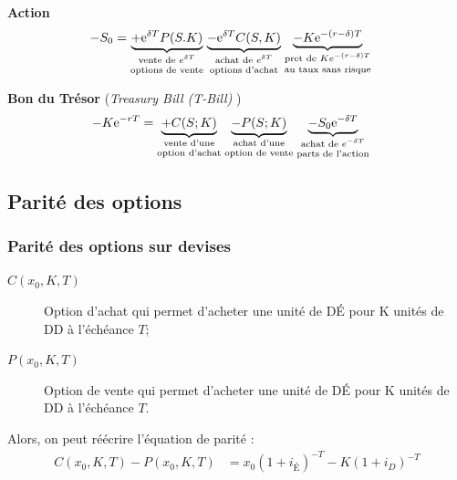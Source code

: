 \documentclass[10pt, french]{article}
\begin{document}
\begin{multicols*}{2}
\textbf{Action}
\begin{align*}
	-S_{0}
	&=	\underset{\text{\shortstack{vente de $e^{\delta T}$\\ options de vente}}}{\underbrace{+\textrm{e}^{\delta T} P(S. K)}} \;
		\underset{\text{\shortstack{achat de $e^{\delta T}$\\ options d'achat}}}{\underbrace{-\textrm{e}^{\delta T} C(S, K)}} \;
		\underset{\text{\shortstack{pret de $Ke^{-(r - \delta)T}$\\ au taux sans risque}}}{\underbrace{-K\textrm{e}^{-(r - \delta)T}}}
\end{align*}

\textbf{Bon du Trésor} (\og \textit{Treasury Bill (T-Bill)} \fg{})
\begin{align*}
	-K \textrm{e}^{-r T}
	&=	\underset{\text{\shortstack{vente d'une\\ option d'achat}}}{\underbrace{+C(S; K)}} \;
		\underset{\text{\shortstack{achat d'une\\ option de vente}}}{\underbrace{-P(S; K)}} \;
		\underset{\text{\shortstack{achat de $e^{-\delta T}$\\ parts de l'action}}}{\underbrace{-S_{0}\textrm{e}^{-\delta T}}}
\end{align*}

\columnbreak
\subsection{Parité des options}

\subsubsection*{Parité des options sur devises}
\begin{description}
	\item[$C(x_0, K, T)$]	Option d'achat qui permet d'acheter une unité de DÉ pour K unités de DD à l'échéance $T$;
	\item[$P(x_0, K, T)$] 	Option de vente qui permet d'acheter une unité de DÉ pour K unités de DD à l'échéance $T$.
\end{description}

Alors, on peut réécrire l'équation de parité : 
\begin{align*}
	C(x_0, K,T) - P(x_0, K, T) 
	&= 	x_0 (1 + i_{\text{É}})^{-T} - K(1 + i_D)^{-T}
\end{align*}


\end{multicols*}
\end{document}
